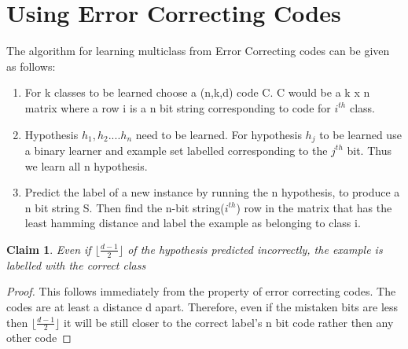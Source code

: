 \documentclass[11pt]{article}
\newtheorem{claim}[theorem]{Claim}
\begin{document}
\section{Using Error Correcting Codes}
    The algorithm for learning multiclass from Error Correcting codes can be given as follows:
    \begin{enumerate}
        \item For k classes to be learned choose a (n,k,d) code C. C would be a k x n matrix where a row i is a n bit string corresponding to code for $i^{th}$ class.
        \item Hypothesis $h_1,h_2....h_n$ need to be learned. For hypothesis $h_j$ to be learned use a binary learner and example set labelled corresponding to the $j^{th}$ bit. Thus we learn all n hypothesis.
        \item Predict the label of a new instance by running the n hypothesis, to produce a n bit string S. Then find the n-bit string($i^{th}$) row in the matrix that has the least hamming distance and label the example as belonging to class i.
    \end{enumerate}
    \begin{claim}
        Even if $\lfloor\frac{d-1}{2}\rfloor$ of the hypothesis predicted incorrectly, the example is labelled with the correct class
    \end{claim}
   \begin{proof}
        This follows immediately from the property of error correcting codes. The codes are at least a distance d apart. Therefore, even if the mistaken bits are less then $\lfloor\frac{d-1}{2}\rfloor$ it will be still closer to the correct label's n bit code rather then any other code
    \end{proof}
    
\end{document}

